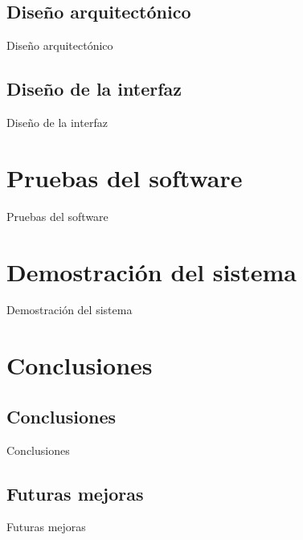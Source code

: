 \documentclass[10pt, hyperref={pdfpagelabels=false}]{beamer}
\begin{document}
    \subsection{Diseño arquitectónico}
      \begin{frame}{Diseño arquitectónico}

      \end{frame}

    \subsection{Diseño de la interfaz}
      \begin{frame}{Diseño de la interfaz}

      \end{frame}


  \section{Pruebas del software}
    \begin{frame}{Pruebas del software}

    \end{frame}


  \section{Demostración del sistema}
    \begin{frame}{Demostración del sistema}

    \end{frame}


  \section{Conclusiones}
    \subsection{Conclusiones}
      \begin{frame}{Conclusiones}

      \end{frame}

    \subsection{Futuras mejoras}
      \begin{frame}{Futuras mejoras}

      \end{frame}
\end{document}
